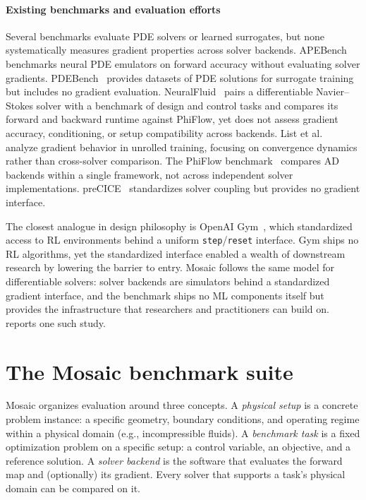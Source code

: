 \paragraph{Existing benchmarks and evaluation efforts}
Several benchmarks evaluate PDE solvers or learned surrogates, but none
systematically measures gradient properties across solver backends.
APEBench~\cite{koehler2024apebench} benchmarks neural PDE emulators on
forward accuracy without evaluating solver gradients.
PDEBench~\cite{takamoto2022pdebench} provides datasets of PDE solutions
for surrogate training but includes no gradient evaluation.
NeuralFluid~\cite{fei2024neuralfluid} pairs a differentiable
Navier--Stokes solver with a benchmark of design and control tasks and
compares its forward and backward runtime against PhiFlow, yet
does not assess gradient accuracy, conditioning, or setup compatibility across backends.
List et al.~\cite{list2024differentiability} analyze gradient behavior in
unrolled training, focusing on convergence dynamics rather than
cross-solver comparison.
The PhiFlow benchmark~\cite{holl2024phiflow} compares AD backends within
a single framework, not across independent solver implementations.
preCICE~\cite{bungartz2016precice} standardizes solver coupling but
provides no gradient interface.

The closest analogue in design philosophy is OpenAI Gym~\cite{brockman2016openai}, which standardized access to RL
environments behind a uniform \texttt{step}/\texttt{reset} interface.
Gym ships no RL algorithms, yet the standardized interface enabled a
wealth of downstream research by lowering the barrier to entry.
Mosaic follows the same model for differentiable solvers: solver
backends are simulators behind a standardized gradient interface, and
the benchmark ships no ML components itself but provides the
infrastructure that researchers and practitioners can build on.
 reports one such study.

\section{The Mosaic benchmark suite}
\label{sec:mosaic}

Mosaic organizes evaluation around three concepts. A \emph{physical
setup} is a concrete problem instance: a specific geometry, boundary
conditions, and operating regime within a physical domain (e.g.,
incompressible fluids). A \emph{benchmark task} is a fixed optimization
problem on a specific setup: a control variable, an objective, and a
reference solution. A \emph{solver backend} is
the software that evaluates the forward map and (optionally) its
gradient. Every solver that supports a
task's physical domain can be compared on it.

